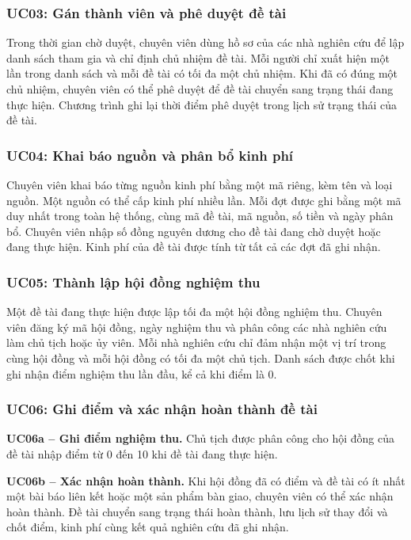 \subsubsection{UC03: Gán thành viên và phê duyệt đề tài}

Trong thời gian chờ duyệt, chuyên viên dùng hồ sơ của các nhà nghiên cứu để lập danh sách tham gia và chỉ định chủ nhiệm đề tài. Mỗi người chỉ xuất hiện một lần trong danh sách và mỗi đề tài có tối đa một chủ nhiệm. Khi đã có đúng một chủ nhiệm, chuyên viên có thể phê duyệt để đề tài chuyển sang trạng thái đang thực hiện. Chương trình ghi lại thời điểm phê duyệt trong lịch sử trạng thái của đề tài.

\subsubsection{UC04: Khai báo nguồn và phân bổ kinh phí}

Chuyên viên khai báo từng nguồn kinh phí bằng một mã riêng, kèm tên và loại nguồn. Một nguồn có thể cấp kinh phí nhiều lần. Mỗi đợt được ghi bằng một mã duy nhất trong toàn hệ thống, cùng mã đề tài, mã nguồn, số tiền và ngày phân bổ. Chuyên viên nhập số đồng nguyên dương cho đề tài đang chờ duyệt hoặc đang thực hiện. Kinh phí của đề tài được tính từ tất cả các đợt đã ghi nhận.

\subsubsection{UC05: Thành lập hội đồng nghiệm thu}
Một đề tài đang thực hiện được lập tối đa một hội đồng nghiệm thu. Chuyên viên đăng ký mã hội đồng, ngày nghiệm thu và phân công các nhà nghiên cứu làm chủ tịch hoặc ủy viên. Mỗi nhà nghiên cứu chỉ đảm nhận một vị trí trong cùng hội đồng và mỗi hội đồng có tối đa một chủ tịch. Danh sách được chốt khi ghi nhận điểm nghiệm thu lần đầu, kể cả khi điểm là 0.

\subsubsection{UC06: Ghi điểm và xác nhận hoàn thành đề tài}
\textbf{UC06a – Ghi điểm nghiệm thu.} Chủ tịch được phân công cho hội đồng của đề tài nhập điểm từ 0 đến 10 khi đề tài đang thực hiện.

\textbf{UC06b – Xác nhận hoàn thành.} Khi hội đồng đã có điểm và đề tài có ít nhất một bài báo liên kết hoặc một sản phẩm bàn giao, chuyên viên có thể xác nhận hoàn thành. Đề tài chuyển sang trạng thái hoàn thành, lưu lịch sử thay đổi và chốt điểm, kinh phí cùng kết quả nghiên cứu đã ghi nhận.

